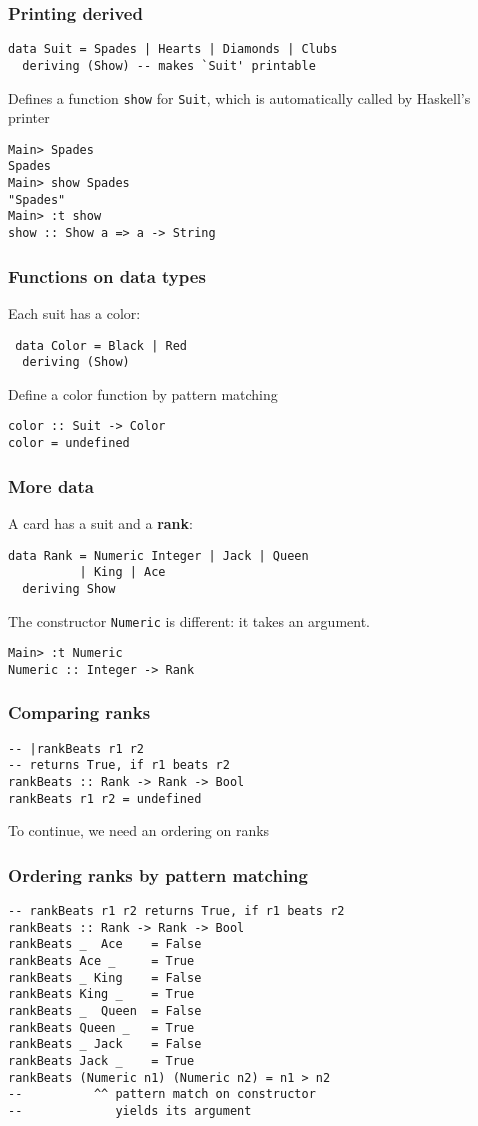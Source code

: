 \documentclass{beamer}
\begin{document}
\begin{frame}
  \frametitle{Printing derived}
\begin{verbatim}
data Suit = Spades | Hearts | Diamonds | Clubs
  deriving (Show) -- makes `Suit' printable
\end{verbatim}
Defines a function \texttt{show} for \texttt{Suit}, which is
automatically called by Haskell's printer
\begin{verbatim}
Main> Spades
Spades
Main> show Spades
"Spades"
Main> :t show 
show :: Show a => a -> String
\end{verbatim}
\end{frame}
\begin{frame}
  \frametitle{Functions on data types}
   Each suit has a color:
\begin{verbatim}
 data Color = Black | Red
  deriving (Show)
\end{verbatim}
   Define a color function by pattern matching
\begin{verbatim}
color :: Suit -> Color
color = undefined
\end{verbatim}
\end{frame}
\begin{frame}
  \frametitle{More data}
  A card has a suit and a \textbf{rank}:
\begin{verbatim}
data Rank = Numeric Integer | Jack | Queen
          | King | Ace
  deriving Show
\end{verbatim}
The constructor \texttt{Numeric} is different: it takes an argument.
\begin{verbatim}
Main> :t Numeric
Numeric :: Integer -> Rank
\end{verbatim}
\end{frame}
\begin{frame}[fragile]
  \frametitle{Comparing ranks}
\begin{verbatim}
-- |rankBeats r1 r2
-- returns True, if r1 beats r2
rankBeats :: Rank -> Rank -> Bool
rankBeats r1 r2 = undefined
\end{verbatim}
  To continue, we need an ordering on ranks
\end{frame}
\begin{frame}[fragile]
  \frametitle{Ordering ranks by pattern matching}
\begin{verbatim}
-- rankBeats r1 r2 returns True, if r1 beats r2
rankBeats :: Rank -> Rank -> Bool
rankBeats _  Ace    = False
rankBeats Ace _     = True
rankBeats _ King    = False
rankBeats King _    = True
rankBeats _  Queen  = False
rankBeats Queen _   = True
rankBeats _ Jack    = False
rankBeats Jack _    = True
rankBeats (Numeric n1) (Numeric n2) = n1 > n2
--          ^^ pattern match on constructor
--             yields its argument
\end{verbatim}
\end{frame}
\end{document}
